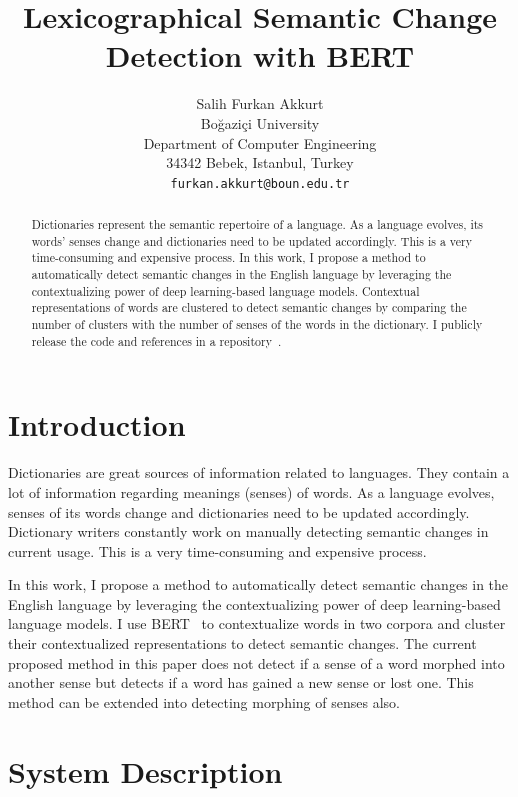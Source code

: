 \documentclass[11pt]{article}
\title{Lexicographical Semantic Change Detection with BERT}
\author{Salih Furkan Akkurt \\
  Boğaziçi University \\
  Department of Computer Engineering \\
  34342 Bebek, Istanbul, Turkey \\
  {\tt furkan.akkurt@boun.edu.tr}
}
\date{}
\begin{document}
\maketitle
\begin{abstract}
  Dictionaries represent the semantic repertoire of a language.
  As a language evolves, its words' senses change and dictionaries need to be updated accordingly.
  This is a very time-consuming and expensive process.
  In this work, I propose a method to automatically detect semantic changes in the English language by leveraging the contextualizing power of deep learning-based language models.
  Contextual representations of words are clustered to detect semantic changes by comparing the number of clusters with the number of senses of the words in the dictionary.
  I publicly release the code and references in a repository~\cite{akkurt-2023-58t-app-repo}.
\end{abstract}

\section{Introduction}

Dictionaries are great sources of information related to languages.
They contain a lot of information regarding meanings (senses) of words.
As a language evolves, senses of its words change and dictionaries need to be updated accordingly.
Dictionary writers constantly work on manually detecting semantic changes in current usage.
This is a very time-consuming and expensive process.

In this work, I propose a method to automatically detect semantic changes in the English language by leveraging the contextualizing power of deep learning-based language models.
I use BERT~\cite{devlin-etal-2019-bert} to contextualize words in two corpora and cluster their contextualized representations to detect semantic changes.
The current proposed method in this paper does not detect if a sense of a word morphed into another sense but detects if a word has gained a new sense or lost one.
This method can be extended into detecting morphing of senses also.


\section{System Description}
\end{document}
